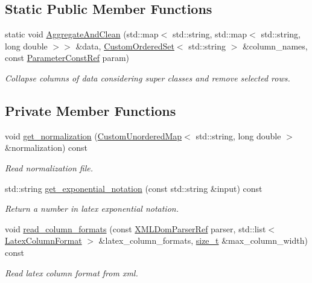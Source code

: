 \subsection*{Static Public Member Functions}
\begin{DoxyCompactItemize}
\item 
static void \hyperlink{classTranslator_a1eda21dbf60011caabaaeed28a4c1604}{Aggregate\+And\+Clean} (std\+::map$<$ std\+::string, std\+::map$<$ std\+::string, long double $>$$>$ \&data, \hyperlink{classCustomOrderedSet}{Custom\+Ordered\+Set}$<$ std\+::string $>$ \&column\+\_\+names, const \hyperlink{Parameter_8hpp_a37841774a6fcb479b597fdf8955eb4ea}{Parameter\+Const\+Ref} param)
\begin{DoxyCompactList}\small\item\em Collapse columns of data considering super classes and remove selected rows. \end{DoxyCompactList}\end{DoxyCompactItemize}
\subsection*{Private Member Functions}
\begin{DoxyCompactItemize}
\item 
void \hyperlink{classTranslator_ab7c4afcf6779d0d8591e6b79a139e6ae}{get\+\_\+normalization} (\hyperlink{custom__map_8hpp_ad1ed68f2ff093683ab1a33522b144adc}{Custom\+Unordered\+Map}$<$ std\+::string, long double $>$ \&normalization) const
\begin{DoxyCompactList}\small\item\em Read normalization file. \end{DoxyCompactList}\item 
std\+::string \hyperlink{classTranslator_a144c5be44c22ad4a4114b4302eb19742}{get\+\_\+exponential\+\_\+notation} (const std\+::string \&input) const
\begin{DoxyCompactList}\small\item\em Return a number in latex exponential notation. \end{DoxyCompactList}\item 
void \hyperlink{classTranslator_a662c8c69ec0358da47990c1cb283af0f}{read\+\_\+column\+\_\+formats} (const \hyperlink{xml__dom__parser_8hpp_a5e6373a495d2b6b4aef3179a48a4ceaf}{X\+M\+L\+Dom\+Parser\+Ref} parser, std\+::list$<$ \hyperlink{classTranslator_1_1LatexColumnFormat}{Latex\+Column\+Format} $>$ \&latex\+\_\+column\+\_\+formats, \hyperlink{tutorial__fpt__2017_2intro_2sixth_2test_8c_a7c94ea6f8948649f8d181ae55911eeaf}{size\+\_\+t} \&max\+\_\+column\+\_\+width) const
\begin{DoxyCompactList}\small\item\em Read latex column format from xml. \end{DoxyCompactList}\end{DoxyCompactItemize}
